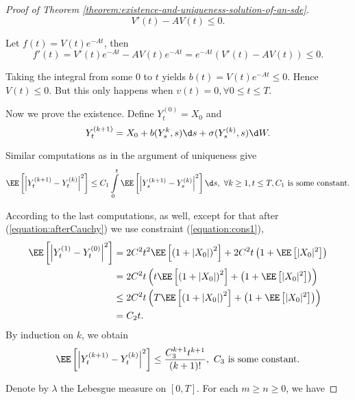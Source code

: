 \begin{proof}[Proof of Theorem \ref{theorem:existence-and-uniqueness-solution-of-an-sde}]
    $$V'(t)-AV(t)\le0.$$

    Let $f(t)=V(t)e^{-At}$, then
    $$f'(t)=V'(t)e^{-At} - AV(t)e^{-At}=e^{-At}(V'(t)-AV(t))\le0.$$

    Taking the integral from some $0$ to $t$ yields $b(t)=V(t)e^{-At}\le 0.$ Hence $V(t)\le 0$. But this only happens when $v(t)=0,\forall 0\le t\le T$.

    Now we prove the existence. Define $Y_t^{(0)}=X_0$ and
    $$Y_t^{(k+1)} = X_0+b(Y_s^k,s)\d s+\sigma(Y_s^{(k)},s)\d W.$$

    Similar computations as in the argument of uniqueness give
    $$\EE\left[\left|Y_t^{(k+1)}-Y_t^{(k)}\right|^2\right]\le C_1\int\limits_0^t \EE\left[\left|Y_s^{(k+1)}-Y_s^{(k)}\right|^2\right]\d s,\,\,\forall k\ge 1, t\le T, C_1 \text{ is some constant}.$$

    According to the last computations, as well, except for that after (\ref{equation:afterCauchy}) we use constraint (\ref{equation:cons1}),
    \begin{align*}
        \EE\left[\left|Y_t^{(1)}-Y_t^{(0)}\right|^2\right]
         & = 2C^2t^2\EE\left[\left(1+|X_0|\right)^2\right]+2C^2t\left(1+\EE\left[|X_0|^2\right]\right)          \\
         & = 2C^2t\left(t\EE\left[\left(1+|X_0|\right)^2\right]+\left(1+\EE\left[|X_0|^2\right]\right)\right)   \\
         & \le 2C^2t\left(T\EE\left[\left(1+|X_0|\right)^2\right]+\left(1+\EE\left[|X_0|^2\right]\right)\right) \\
         & =C_2t.
    \end{align*}
    By induction on $k$, we obtain
    \begin{equation}
        \label{equation:upperY}
        \EE\left[\left|Y_t^{(k+1)}-Y_t^{(k)}\right|^2\right]\le\dfrac{C_3^{k+1}t^{k+1}}{(k+1)!}, \,\, C_3 \text{ is some constant}.
    \end{equation}

    Denote by $\lambda$ the Lebesgue measure on $[0,T]$. For each $m\ge n\ge 0$, we have


\end{proof}
